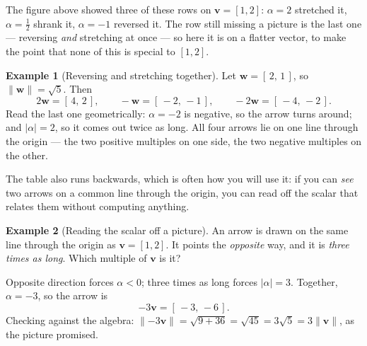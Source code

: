 \documentclass[11pt]{article}
\theoremstyle{definition}
\newtheorem{ex}{Example}
\theoremstyle{remark}
\newcommand{\vc}[1]{\mathbf{#1}}
\newcommand{\norm}[1]{\lVert #1\rVert}
\newcommand{\lattice}[4]{%
  \draw[step=1cm,gray!25,very thin] (#1,#3) grid (#2,#4);
  \draw[axisline] (#1,0) -- (#2+0.45,0) node[right,font=\scriptsize,black]{$x$};
  \draw[axisline] (0,#3) -- (0,#4+0.45) node[above,font=\scriptsize,black]{$y$};
}
\begin{document}
\noindent The figure above showed three of these rows on $\vc{v}=[1,2]$:
$\alpha=2$ stretched it, $\alpha=\tfrac12$ shrank it, $\alpha=-1$ reversed it.
The row still missing a picture is the last one --- reversing \emph{and}
stretching at once --- so here it is on a flatter vector, to make the point that
none of this is special to $[1,2]$.

\begin{ex}[Reversing and stretching together]
Let $\vc{w}=[\,2,\,1\,]$, so $\norm{\vc{w}}=\sqrt5$. Then
\[
  2\vc{w}=[\,4,\,2\,],
  \qquad
  -\vc{w}=[\,-2,\,-1\,],
  \qquad
  -2\vc{w}=[\,-4,\,-2\,].
\]
Read the last one geometrically: $\alpha=-2$ is negative, so the arrow turns
around; and $\lvert\alpha\rvert=2$, so it comes out twice as long. All four
arrows lie on one line through the origin --- the two positive multiples on one
side, the two negative multiples on the other.
\end{ex}

\begin{center}
\end{center}

\noindent The table also runs backwards, which is often how you will use it: if
you can \emph{see} two arrows on a common line through the origin, you can read
off the scalar that relates them without computing anything.

\begin{ex}[Reading the scalar off a picture]
An arrow is drawn on the same line through the origin as $\vc{v}=[1,2]$. It
points the \emph{opposite} way, and it is \emph{three times as long}. Which
multiple of $\vc{v}$ is it?

Opposite direction forces $\alpha<0$; three times as long forces
$\lvert\alpha\rvert=3$. Together, $\alpha=-3$, so the arrow is
\[
  -3\vc{v}=[\,-3,\,-6\,].
\]
Checking against the algebra:
$\norm{-3\vc{v}}=\sqrt{9+36}=\sqrt{45}=3\sqrt5=3\norm{\vc{v}}$, as the picture
promised.
\end{ex}
\end{document}
